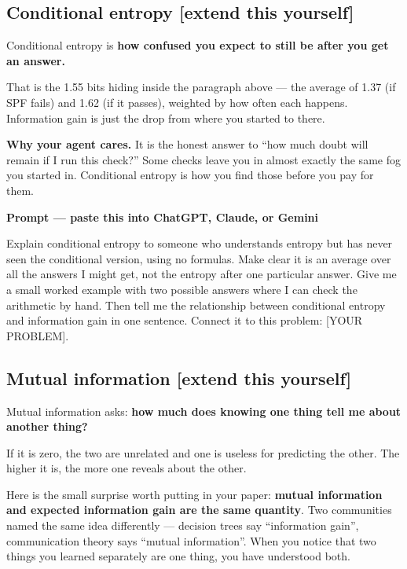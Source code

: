 \documentclass[11pt,a4paper]{article}
\newcommand{\boxtitle}[1]{{\bfseries #1}\par\vspace{2pt}}
\newcommand{\extend}{\hfill{\footnotesize\sffamily\color{sbaccent}[extend this yourself]}}
\newenvironment{learnprompt}
  {\begin{sbbox}\boxtitle{Prompt --- paste this into ChatGPT, Claude, or Gemini}%
   \ttfamily\small\raggedright}
  {\end{sbbox}}
\begin{document}
\subsection{Conditional entropy \extend}

Conditional entropy is \textbf{how confused you expect to still be after you get an answer.}

That is the 1.55 bits hiding inside the paragraph above --- the average of 1.37 (if SPF fails)
and 1.62 (if it passes), weighted by how often each happens. Information gain is just the drop
from where you started to there.

\textbf{Why your agent cares.} It is the honest answer to ``how much doubt will remain if I run
this check?'' Some checks leave you in almost exactly the same fog you started in. Conditional
entropy is how you find those before you pay for them.

\begin{learnprompt}
Explain conditional entropy to someone who understands entropy but has never seen the conditional
version, using no formulas. Make clear it is an average over all the answers I might get, not the
entropy after one particular answer. Give me a small worked example with two possible answers
where I can check the arithmetic by hand. Then tell me the relationship between conditional
entropy and information gain in one sentence. Connect it to this problem: [YOUR PROBLEM].
\end{learnprompt}

\subsection{Mutual information \extend}

Mutual information asks: \textbf{how much does knowing one thing tell me about another thing?}

If it is zero, the two are unrelated and one is useless for predicting the other. The higher it
is, the more one reveals about the other.

Here is the small surprise worth putting in your paper: \textbf{mutual information and expected
information gain are the same quantity}. Two communities named the same idea differently ---
decision trees say ``information gain'', communication theory says ``mutual information''. When
you notice that two things you learned separately are one thing, you have understood both.
\end{document}
